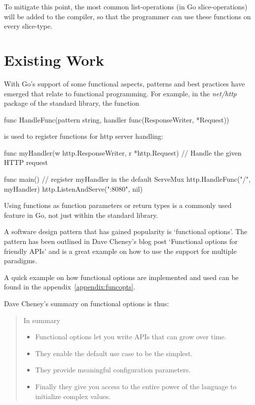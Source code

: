 To mitigate this point, the most common list-operations (in Go slice-operations) will be added to
the compiler, so that the programmer can use these functions on every slice-type.

\section{Existing Work}

With Go's support of some functional aspects, patterns and best practices have emerged that relate
to functional programming.
For example, in the \textit{net/http} package of the standard library, the function
\begin{gocode}
func HandleFunc(pattern string, handler func(ResponseWriter, *Request))
\end{gocode}
is used to register functions for http server handling:

\begin{gocode}
func myHandler(w http.ResponseWriter, r *http.Request) {
    // Handle the given HTTP request
}

func main() {
    // register myHandler in the default ServeMux
    http.HandleFunc("/", myHandler)
    http.ListenAndServe(":8080", nil)
}
\end{gocode}
\autocite{go-http-doc}

Using functions as function parameters or return types is a commonly used feature in Go, not just
within the standard library.

A software design pattern that has gained popularity is `functional options'. The pattern has been
outlined in Dave Cheney's blog post `Functional options for friendly APIs'
and is a great example on how to use the support for multiple paradigms.

A quick example on how functional options are implemented and used can be found in the
appendix~\ref{appendix:funcopts}.

Dave Cheney's summary on functional options is thus:
\begin{quote}
    In summary
    \begin{itemize}
        \item Functional options let you write APIs that can grow over time.
        \item They enable the default use case to be the simplest.
        \item They provide meaningful configuration parameters.
        \item Finally they give you access to the entire power of the language to initialize complex values.
    \end{itemize}\autocite{functional-options}
\end{quote}

